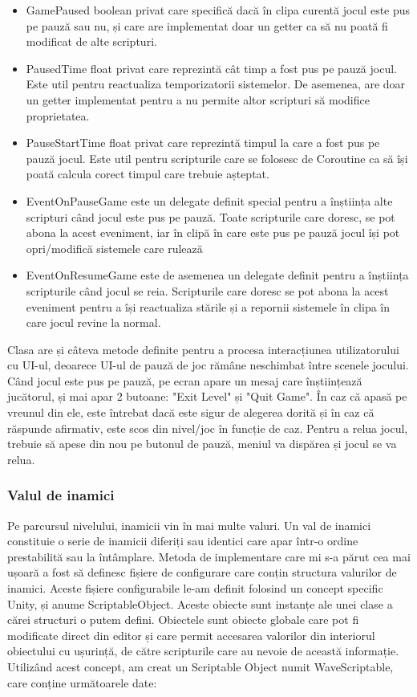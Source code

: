 \documentclass[12pt, a4paper]{article}
\begin{document}
	\begin{itemize}
		\item GamePaused boolean privat care specifică dacă în clipa curentă jocul este pus pe pauză sau nu, și care are implementat doar un getter ca să nu poată fi modificat de alte scripturi.
		\item PausedTime float privat care reprezintă cât timp a fost pus pe pauză jocul. Este util pentru reactualiza temporizatorii sistemelor. De asemenea, are doar un getter implementat pentru a nu permite altor scripturi să modifice proprietatea.
		\item PauseStartTime float privat care reprezintă timpul la care a fost pus pe pauză jocul. Este util pentru scripturile care se folosesc de Coroutine ca să își poată calcula corect timpul care trebuie așteptat.
		\item EventOnPauseGame este un delegate definit special pentru a înștiința alte scripturi când jocul este pus pe pauză. Toate scripturile care doresc, se pot abona la acest eveniment, iar în clipă în care este pus pe pauză jocul își pot opri/modifică sistemele care rulează
		\item EventOnResumeGame este de asemenea un delegate definit pentru a înștiința scripturile când jocul se reia. Scripturile care doresc se pot abona la acest eveniment pentru a își reactualiza stările și a repornii sistemele în clipa în care jocul revine la normal.
	\end{itemize}
	
	Clasa are și câteva metode definite pentru a procesa interacțiunea utilizatorului cu UI-ul, deoarece UI-ul de pauză de joc rămâne neschimbat între scenele jocului. Când jocul este pus pe pauză, pe ecran apare un mesaj care înștiințează jucătorul, și mai apar 2 butoane: "Exit Level" și "Quit Game". În caz că apasă pe vreunul din ele, este întrebat dacă este sigur de alegerea dorită și în caz că răspunde afirmativ, este scos din nivel/joc în funcție de caz. Pentru a relua jocul, trebuie să apese din nou pe butonul de pauză, meniul va dispărea și jocul se va relua.
	
	
	
	
	
	\subsubsection{Valul de inamici}
	\label{section: enemyWave}
	
	Pe parcursul nivelului, inamicii vin în mai multe valuri. Un val de inamici constituie o serie de inamicii diferiți sau identici care apar într-o ordine prestabilită sau la întâmplare. Metoda de implementare care mi s-a părut cea mai ușoară a fost să definesc fișiere de configurare care conțin structura valurilor de inamici. Aceste fișiere configurabile le-am definit folosind un concept specific Unity, și anume ScriptableObject. Aceste obiecte sunt instanțe ale unei clase a cărei structuri o putem defini. Obiectele sunt obiecte globale care pot fi modificate direct din editor și care permit accesarea valorilor din interiorul obiectului cu ușurință, de către scripturile care au nevoie de această informație. Utilizând acest concept, am creat un Scriptable Object numit WaveScriptable, care conține următoarele date:
	
\end{document}
